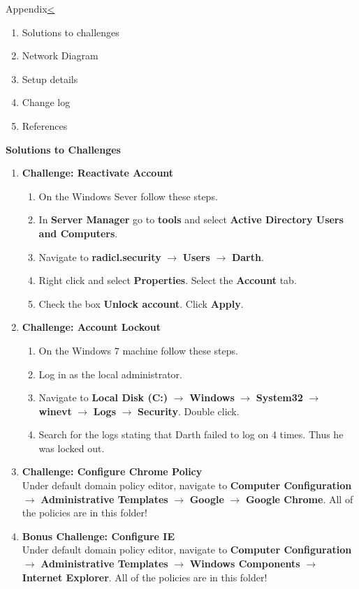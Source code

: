 \documentclass[12pt]{extarticle}
\newenvironment{instructionblock}{\Large\bgroup}{\egroup}
\newcommand{\ben}{\begin{enumerate}}
\newcommand{\een}{\end{enumerate}}
\begin{document}
\pagebreak
\begin{slide}{Appendix}{\hyperref[slide 14]{\textless}}
	\begin{instructionblock}
		\ben
			\item Solutions to challenges
			\item Network Diagram
			\item Setup details
			\item Change log
			\item References
		\een
	\end{instructionblock}
\end{slide}
\pagebreak
\textbf{Solutions to Challenges}\\
\ben
	\item \textbf{Challenge: Reactivate Account}
		\ben
			\item On the Windows Sever follow these steps.
			\item In \textbf{Server Manager} go to \textbf{tools} and select \textbf{Active Directory Users and Computers}.
			\item Navigate to \textbf{radicl.security} $\rightarrow$ \textbf{Users} $\rightarrow$ \textbf{Darth}.
			\item Right click and select \textbf{Properties}. Select the \textbf{Account} tab.
			\item Check the box \textbf{Unlock account}. Click \textbf{Apply}.
		\een
	\item \textbf{Challenge: Account Lockout}
		\ben
			\item On the Windows 7 machine follow these steps.
			\item Log in as the local administrator.
			\item Navigate to \textbf{Local Disk (C:)} $\rightarrow$ \textbf{Windows} $\rightarrow$ \textbf{System32} $\rightarrow$ \textbf{winevt} $\rightarrow$ \textbf{Logs} $\rightarrow$ \textbf{Security}. Double click.
			\item Search for the logs stating that Darth failed to log on 4 times. Thus he was locked out.
		\een
	\item \textbf{Challenge: Configure Chrome Policy}\\
Under default domain policy editor, navigate to \textbf{Computer Configuration} $\rightarrow$ \textbf{Administrative Templates} $\rightarrow$ \textbf{Google} $\rightarrow$ \textbf{Google Chrome}. All of the policies are in this folder!
	\item \textbf{Bonus Challenge: Configure IE}\\
	Under default domain policy editor, navigate to \textbf{Computer Configuration} $\rightarrow$ \textbf{Administrative Templates} $\rightarrow$ \textbf{Windows Components} $\rightarrow$ \textbf{Internet Explorer}. All of the policies are in this folder!
\een
\end{document}

